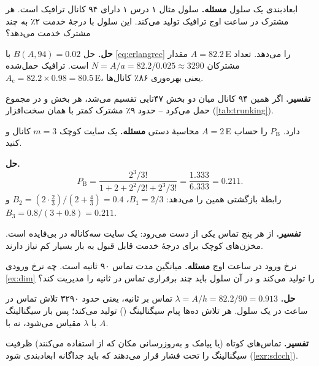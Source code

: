 \documentclass[11pt,a4paper]{article}
\begin{document}
\begin{examplebox}{ابعادبندی یک سلول}\label{ex:dim}
\textbf{مسئله.} سلول مثال ۱ درس ۱ دارای ۹۴ کانال ترافیک است. هر مشترک در ساعت اوج 
ترافیک تولید می‌کند. این سلول با درجهٔ خدمت ۲٪ به چند مشترک خدمت می‌دهد؟

\textbf{حل.} حل $B(A,94) = 0.02$ با \cref{eq:erlangrec} مقدار $A = 82.2$\,E را می‌دهد. تعداد
مشترکان $N = A/a = 82.2/0.025 \approx 3290$ است. ترافیک حمل‌شده
$A_{\mathrm{c}} = 82.2\times0.98 = 80.5$\,E، یعنی بهره‌وری ۸۶٪ کانال‌ها.

\textbf{تفسیر.} اگر همین ۹۴ کانال میان دو بخش ۴۷تایی تقسیم می‌شد، هر بخش  و در مجموع
 حمل می‌کرد -- حدود ۹٪ مشترک کمتر با همان سخت‌افزار (\cref{tab:trunking}).
\end{examplebox}

\begin{examplebox}{محاسبهٔ دستی }\label{ex:hand}
\textbf{مسئله.} یک سایت کوچک $m=3$ کانال و $A=2$\,E دارد. $P_{\mathrm{B}}$ را حساب کنید.

\textbf{حل.}
\begin{equation*}
  P_{\mathrm{B}} = \frac{2^3/3!}{1 + 2 + 2^2/2! + 2^3/3!}
  = \frac{1.333}{6.333} = 0.211 .
\end{equation*}
رابطهٔ بازگشتی همین را می‌دهد: $B_1 = 2/3$، $B_2 = (2\cdot\tfrac23)/(2+\tfrac43) = 0.4$ و
$B_3 = 0.8/(3+0.8) = 0.211$.

\textbf{تفسیر.} از هر پنج تماس یکی از دست می‌رود: یک سایت سه‌کاناله در  بی‌فایده است.
مخزن‌های کوچک برای درجهٔ خدمت قابل قبول به بار بسیار کم نیاز دارند.
\end{examplebox}

\begin{examplebox}{نرخ ورود در ساعت اوج}\label{ex:lambda}
\textbf{مسئله.} میانگین مدت تماس ۹۰ ثانیه است. چه نرخ ورودی  \cref{ex:dim} را تولید
می‌کند و  در آن سلول باید چند برقراری تماس در ثانیه را مدیریت کند؟

\textbf{حل.} $\lambda = A/h = 82.2/90 = 0.913$ تماس بر ثانیه، یعنی حدود ۳۲۹۰ تلاش تماس در ساعت
در یک سلول. هر تلاش ده‌ها پیام سیگنالینگ () تولید می‌کند؛ پس بار
سیگنالینگ با $\lambda$ مقیاس می‌شود، نه با $A$.

\textbf{تفسیر.} تماس‌های کوتاه (یا پیامک و به‌روزرسانی مکان که از  استفاده می‌کنند)
ظرفیت سیگنالینگ را تحت فشار قرار می‌دهند که باید جداگانه ابعادبندی شود (\cref{exr:sdcch}).
\end{examplebox}
\end{document}
